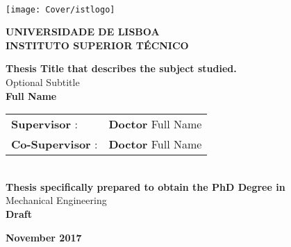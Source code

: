 \setcounter{page}{1} 


\thispagestyle{empty}
\begin{flushleft} ~\\ \vspace{-12mm} \hspace{-12mm}  \texttt{[image: Cover/istlogo]} 
 
\centering
\LARGE \textbf{UNIVERSIDADE DE LISBOA \\ INSTITUTO SUPERIOR TÉCNICO}
\vspace{30mm}

 \vspace{5mm}
 
\centering
\LARGE \textbf{Thesis Title that describes the subject studied.}
\\ \vspace{10mm}
\Large Optional Subtitle
\\ \vspace{15mm}
\Large \textbf{Full Name} \\
\vspace{4cm}

\begin{minipage}{\textwidth}
\begin{tabularx}{\textwidth}{ l @{ } l }
\large \textbf{Supervisor} : & \textbf{Doctor} Full Name\\
 \large \textbf{Co-Supervisor} :  & \textbf{Doctor} Full Name\\
\end{tabularx}

\end{minipage}
%
\\ \vspace{27mm}
\centering
\large \textbf{Thesis specifically prepared to obtain the PhD Degree in}\\
\large Mechanical Engineering\\
\vspace{18mm}
\Large \textbf{Draft}
 
\vspace{15mm}

\large \textbf{November 2017} \\
\let\thepage\relax
\end{flushleft}
\pagebreak
